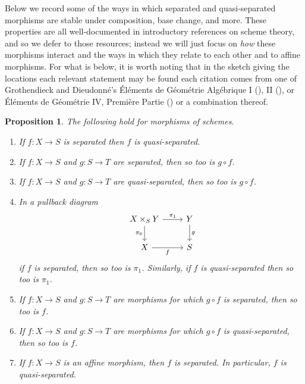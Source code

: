 \documentclass{amsart}
\newtheorem{proposition}[equation]{Proposition}
\theoremstyle{definition}
\numberwithin{equation}{subsection}
\begin{document}
Below we record some of the ways in which separated and quasi-separated morphisms are stable under composition, base change, and more. These properties are all well-documented in introductory references on scheme theory, and so we defer to those resources; instead we will just focus on \emph{how} these morphisms interact and the ways in which they relate to each other and to affine morphisms. For what is below, it is worth noting that in the sketch giving the locations each relevant statement may be found each citation comes from one of Grothendieck and Dieudonn{\'e}'s {\'E}l{\'e}ments de G{\'e}om{\'e}trie Alg{\'e}brique I (\cite{EGA1}), II (\cite{EGA2}), or {\'E}l{\'e}ments de G{\'e}om{\'e}trie IV, Premi{\`e}re Partie (\cite{EGA41}) or a combination thereof.

\begin{proposition}\label{Prop: Section Gabriel: Properties of separation stuffs}
The following hold for morphisms of schemes.
\begin{enumerate}
	\item If $f:X \to S$ is separated then $f$ is quasi-separated.
	\item If $f:X\to S$ and $g:S \to T$ are separated, then so too is $g \circ f$.
	\item If $f:X\to S$ and $g:S \to T$ are quasi-separated, then so too is $g \circ f$.
	\item In a pullback diagram
	\[
	\begin{tikzcd}
		X \times_S Y \ar[r]{}{\pi_1} \ar[d, swap]{}{\pi_0} & Y \ar[d]{}{g} \\
		X \ar[r, swap]{}{f} & S
	\end{tikzcd}
	\]
	if $f$ is separated, then so too is $\pi_1$. Similarly, if $f$ is quasi-separated then so too is $\pi_1$.
	\item If $f:X \to S$ and $g:S \to T$ are morphisms for which $g \circ f$ is separated, then so too is $f$.
	\item If $f:X \to S$ and $g:S \to T$ are morphisms for which $g \circ f$ is quasi-separated, then so too is $f$.
	\item If $f:X \to S$ is an affine morphism, then $f$ is separated. In particular, $f$ is quasi-separated.
\end{enumerate}
\end{proposition}
\end{document}
